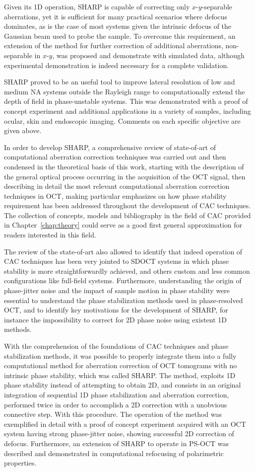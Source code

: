 Given its 1D operation, SHARP is capable of correcting only $x$-$y$-separable aberrations, yet it is sufficient for many practical scenarios where defocus dominates, as is the case of most systems given the intrinsic defocus of the Gaussian beam used to probe the sample. To overcome this requirement, an extension of the method for further correction of additional aberrations, non-separable in $x$-$y$, was proposed and demonstrate with simulated data, although experimental demonstration is indeed necessary for a complete validation.

SHARP proved to be an useful tool to improve lateral resolution of low and medium NA systems outside the Rayleigh range to computationally extend the depth of field in phase-unstable systems. This was demonstrated with a proof of concept experiment and additional applications in a variety of samples, including ocular, skin and endoscopic imaging. Comments on each specific objective are given above.

In order to develop SHARP, a comprehensive review of state-of-art of computational aberration correction techniques was carried out and then condensed in the theoretical basis of this work, starting with the description of the general optical process occurring in the acquisition of the OCT signal, then describing in detail the most relevant computational aberration correction techniques in OCT, making particular emphasizes on how phase stability requirement has been addressed throughout the development of CAC techniques. The collection of concepts, models and bibliography in the field of CAC provided in Chapter~\ref{chap:theory} could serve as a good first general approximation for readers interested in this field.

The review of the state-of-art also allowed to identify that indeed operation of CAC techniques has been very jointed to SDOCT systems in which phase stability is more straightforwardly achieved, and others custom and less common configurations like full-field systems. Furthermore, understanding the origin of phase-jitter noise and the impact of sample motion in phase stability were essential to understand the phase stabilization methods used in phase-resolved OCT, and to identify key motivations for the development of SHARP, for instance the impossibility to correct for 2D phase noise using existent 1D methods.

With the comprehension of the foundations of CAC techniques and phase stabilization methods, it was possible to properly integrate them into a fully computational method for aberration correction of OCT tomograms with no intrinsic phase stability, which was called SHARP. The method, exploits 1D phase stability instead of attempting to obtain 2D, and consists in an original integration of sequential 1D phase stabilization and aberration correction, performed twice in order to accomplish a 2D correction with a unobvious connective step. With this procedure. The operation of the method was exemplified in detail with a proof of concept experiment acquired with an OCT system having strong phase-jitter noise, showing successful 2D correction of defocus. Furthermore, an extension of SHARP to operate in PS-OCT was described and demonstrated in computational refocusing of polarimetric properties.

